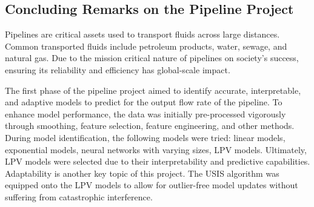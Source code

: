 \subsection{Concluding Remarks on the Pipeline Project}
Pipelines are critical assets used to transport fluids across large distances.  Common transported fluids include petroleum products, water, sewage, and natural gas. Due to the mission critical nature of pipelines on society's success, ensuring its reliability and efficiency has global-scale impact. 

The first phase of the pipeline project aimed to identify accurate, interpretable, and adaptive models to predict for the output flow rate of the pipeline.  To enhance model performance, the data was initially pre-processed vigorously through smoothing, feature selection, feature engineering, and other methods.  During model identification, the following models were tried: linear models, exponential models, neural networks with varying sizes, LPV models.  Ultimately, LPV models were selected due to their interpretability and predictive capabilities. Adaptability is another key topic of this project. The USIS algorithm was equipped onto the LPV models to allow for outlier-free model updates without suffering from catastrophic interference.
